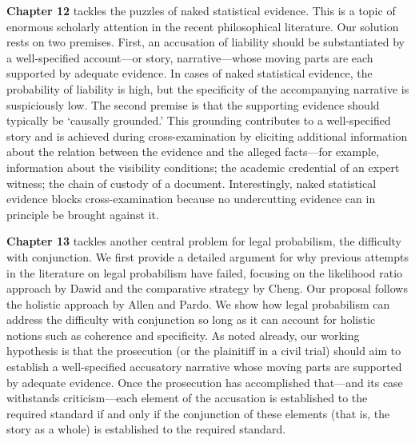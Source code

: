 \documentclass[
  10pt,
  dvipsnames,enabledeprecatedfontcommands]{scrartcl}
\begin{document}
\textbf{Chapter 12} tackles the puzzles of naked statistical evidence.
This is a topic of enormous scholarly attention in the recent
philosophical literature. Our solution rests on two premises. First, an
accusation of liability should be substantiated by a well-specified
account---or story, narrative---whose moving parts are each supported by
adequate evidence. In cases of naked statistical evidence, the
probability of liability is high, but the specificity of the
accompanying narrative is suspiciously low. The second premise is that
the supporting evidence should typically be `causally grounded.' This
grounding contributes to a well-specified story and is achieved during
cross-examination by eliciting additional information about the relation
between the evidence and the alleged facts---for example, information
about the visibility conditions; the academic credential of an expert
witness; the chain of custody of a document. Interestingly, naked
statistical evidence blocks cross-examination because no undercutting
evidence can in principle be brought against it.

\textbf{Chapter 13} tackles another central problem for legal
probabilism, the difficulty with conjunction. We first provide a
detailed argument for why previous attempts in the literature on legal
probabilism have failed, focusing on the likelihood ratio approach by
Dawid and the comparative strategy by Cheng. Our proposal follows the
holistic approach by Allen and Pardo. We show how legal probabilism can
address the difficulty with conjunction so long as it can account for
holistic notions such as coherence and specificity. As noted already,
our working hypothesis is that the prosecution (or the plainitiff in a
civil trial) should aim to establish a well-specified accusatory
narrative whose moving parts are supported by adequate evidence. Once
the prosecution has accomplished that---and its case withstands
criticism---each element of the accusation is established to the
required standard if and only if the conjunction of these elements (that
is, the story as a whole) is established to the required standard.
\end{document}
